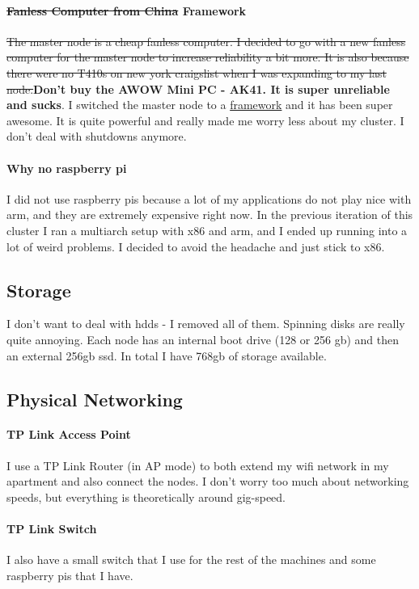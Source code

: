 \documentclass[12pt]{article}
\begin{document}
\paragraph{\sout{Fanless Computer from China} Framework}
\sout{The master node is a cheap fanless computer. I decided to go with a new fanless computer for the master node to increase reliability a bit more. It is also because there were no T410s on new york craigslist when I was expanding to my last node.}\textbf{Don't buy the AWOW Mini PC - AK41. It is super unreliable and sucks}.
I switched the master node to a \href{https://frame.work/}{framework} and it has been super awesome. It is quite powerful and really made me worry less about my cluster. I don't deal with shutdowns anymore.

\paragraph{Why no raspberry pi}
I did not use raspberry pis because a lot of my applications do not play nice with arm, and they are extremely expensive right now. In the previous iteration of this cluster I ran a multiarch setup with x86 and arm, and I ended up running into a lot of weird problems. I decided to avoid the headache and just stick to x86.

\subsection{Storage}
I don't want to deal with hdds - I removed all of them. Spinning disks are really quite annoying. Each node has an internal boot drive (128 or 256 gb) and then an external 256gb ssd. In total I have 768gb of storage available.

\subsection{Physical Networking}
\paragraph{TP Link Access Point}
I use a TP Link Router (in AP mode) to both extend my wifi network in my apartment and also connect the nodes. I don't worry too much about networking speeds, but everything is theoretically around gig-speed.
\paragraph{TP Link Switch}
I also have a small switch that I use for the rest of the machines and some raspberry pis that I have.
\end{document}

